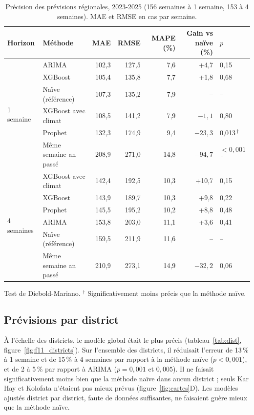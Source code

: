 \documentclass[11pt]{article}
\begin{document}
\begin{table}[!htbp]\centering\small
\caption{Précision des prévisions régionales, 2023-2025 (156 semaines à 1 semaine, 153 à 4 semaines). MAE et RMSE en cas par semaine.}\label{tab:reg}
\begin{tabular}{@{}llrrrrl@{}}\toprule
Horizon & Méthode & MAE & RMSE & MAPE (\%) & Gain vs naïve (\%) & $p$ \\\midrule
\multirow{6}{*}{1 semaine} & ARIMA & 102,3 & 127,5 & 7,6 & +4,7 & 0,15 \\
 & XGBoost & 105,4 & 135,8 & 7,7 & +1,8 & 0,68 \\
 & Naïve (référence) & 107,3 & 135,2 & 7,9 & -- & -- \\
 & XGBoost avec climat & 108,5 & 141,2 & 7,9 & $-1{,}1$ & 0,80 \\
 & Prophet & 132,3 & 174,9 & 9,4 & $-23{,}3$ & 0,013\,$^{\dagger}$ \\
 & Même semaine an passé & 208,9 & 271,0 & 14,8 & $-94{,}7$ & $<0{,}001$\,$^{\dagger}$ \\\midrule
\multirow{6}{*}{4 semaines} & XGBoost avec climat & 142,4 & 192,5 & 10,3 & +10,7 & 0,15 \\
 & XGBoost & 143,9 & 189,7 & 10,3 & +9,8 & 0,22 \\
 & Prophet & 145,5 & 195,2 & 10,2 & +8,8 & 0,48 \\
 & ARIMA & 153,8 & 203,0 & 11,1 & +3,6 & 0,41 \\
 & Naïve (référence) & 159,5 & 211,9 & 11,6 & -- & -- \\
 & Même semaine an passé & 210,9 & 273,1 & 14,9 & $-32{,}2$ & 0,06 \\\bottomrule
\end{tabular}
\par\smallskip\footnotesize\raggedright Test de Diebold-Mariano. $^{\dagger}$ Significativement moins précis que la méthode naïve.
\end{table}


\subsection{Prévisions par district}
À l'échelle des districts, le modèle global était le plus précis (tableau~\ref{tab:dist}, figure~\ref{fig:f11_districts}). Sur l'ensemble des districts, il réduisait l'erreur de 13\,\% à 1 semaine et de 15\,\% à 4 semaines par rapport à la méthode naïve ($p<0{,}001$), et de 2 à 5\,\% par rapport à ARIMA ($p=0{,}001$ et $0{,}005$). Il ne faisait significativement moins bien que la méthode naïve dans aucun district ; seuls Kar Hay et Kolofata n'étaient pas mieux prévus (figure~\ref{fig:cartes}D). Les modèles ajustés district par district, faute de données suffisantes, ne faisaient guère mieux que la méthode naïve.
\end{document}
